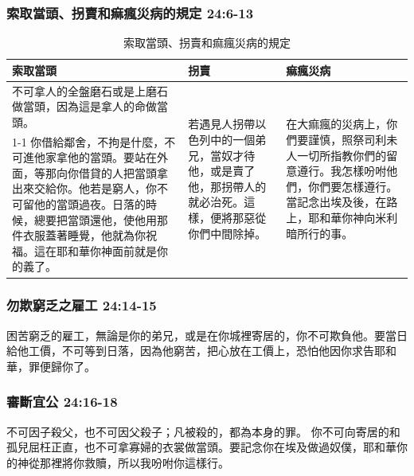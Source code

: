 \subsubsection{索取當頭、拐賣和痲瘋災病的規定 24:6-13}
\begin{table}[H]
\begin{center}
\begin{tabular}{ p{9.5cm}|p{}|p{}} \toprule
索取當頭&拐賣&痲瘋災病\\\hline
不可拿人的全盤磨石或是上磨石做當頭，因為這是拿人的命做當頭。
&\multirow{2}{3.cm}{若遇見人拐帶以色列中的一個弟兄，當奴才待他，或是賣了他，那拐帶人的就必治死。這樣，便將那惡從你們中間除掉。 }
&\multirow{2}{4cm}{在大痲瘋的災病上，你們要謹慎，照祭司利未人一切所指教你們的留意遵行。我怎樣吩咐他們，你們要怎樣遵行。當記念出埃及後，在路上，耶和華你神向米利暗所行的事。} \\ \cline{1-1}
你借給鄰舍，不拘是什麼，不可進他家拿他的當頭。要站在外面，等那向你借貸的人把當頭拿出來交給你。他若是窮人，你不可留他的當頭過夜。日落的時候，總要把當頭還他，使他用那件衣服蓋著睡覺，他就為你祝福。這在耶和華你神面前就是你的義了。& & \\\hline
\end{tabular}
\end{center}
\caption{索取當頭、拐賣和痲瘋災病的規定}
\end{table}



\subsubsection{勿欺窮乏之雇工 24:14-15}
困苦窮乏的雇工，無論是你的弟兄，或是在你城裡寄居的，你不可欺負他。要當日給他工價，不可等到日落，因為他窮苦，把心放在工價上，恐怕他因你求告耶和華，罪便歸你了。



\subsubsection{審斷宜公 24:16-18}
不可因子殺父，也不可因父殺子；凡被殺的，都為本身的罪。
你不可向寄居的和孤兒屈枉正直，也不可拿寡婦的衣裳做當頭。要記念你在埃及做過奴僕，耶和華你的神從那裡將你救贖，所以我吩咐你這樣行。


